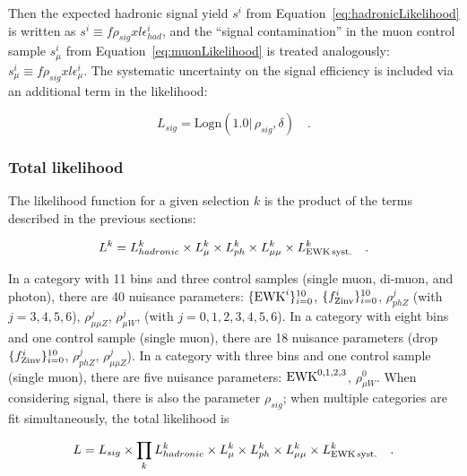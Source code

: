 Then the expected hadronic signal yield $s^i$ from
Equation~\ref{eq:hadronicLikelihood} is written as $s^i \equiv
f\rho_{sig} xl\epsilon_{had}^i$, and the ``signal contamination'' in
the muon control sample $s_{\mu}^i$ from
Equation~\ref{eq:muonLikelihood} is treated analogously: $s_{\mu}^i
\equiv f\rho_{sig} xl\epsilon_{\mu}^i$.  The systematic uncertainty on
the signal efficiency is included via an additional term in the
likelihood:

\begin{equation}
L_{sig}=\mathrm{Logn}(1.0 |\,\rho_{sig}, \delta) \quad .
\end{equation}

\subsubsection{Total likelihood}
\label{sec:totalLikelihood}

The likelihood function for a given selection $k$ is the product of
the terms described in the previous sections:

\begin{equation}
L^k = L_{hadronic}^k \times L_{\mu}^k \times L_{ph}^k \times
L_{\mu\mu}^k\times L_{\rm EWK\, syst.}^k \quad .
\end{equation}

In a category with 11 \HT bins and three control samples (single muon,
di-muon, and photon), there are 40 nuisance parameters:
$\{\ewk^{i}\}_{i=0}^{10}$, $\{\fZinv{i}\}_{i=0}^{10}$, $\rho_{phZ}^j$
(with $j=3,4,5,6$), $\rho_{\mu\mu Z}^j$, $\rho_{\mu W}^j$, (with
$j=0,1,2,3,4,5,6$).  In a category with eight \HT bins and one control
sample (single muon), there are 18 nuisance parameters (drop
$\{\fZinv{i}\}_{i=0}^{10}$, $\rho_{phZ}^j$, $\rho_{\mu\mu Z}^j$).  In
a category with three \HT bins and one control sample (single muon),
there are five nuisance parameters: $\ewk^{0,1,2,3}$, $\rho_{\mu
  W}^0$.  When considering signal, there is also the parameter
$\rho_{sig}$; when multiple categories are fit simultaneously, the
total likelihood is


\begin{equation}
L = L_{sig}\times \prod_k L_{hadronic}^k
\times L_{\mu}^k \times L_{ph}^k \times L_{\mu\mu}^k \times L_{\rm EWK\, syst.}^k \quad .
\end{equation}




